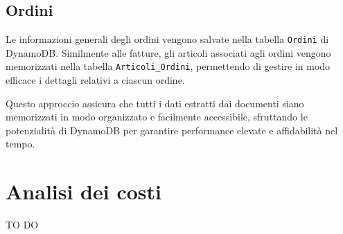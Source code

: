 \subsection{Ordini}
Le informazioni generali degli ordini vengono salvate nella tabella \texttt{Ordini} di DynamoDB. Similmente alle fatture, gli articoli associati agli ordini vengono memorizzati nella tabella \texttt{Articoli\_Ordini}, permettendo di gestire in modo efficace i dettagli relativi a ciascun ordine.

Questo approccio assicura che tutti i dati estratti dai documenti siano memorizzati in modo organizzato e facilmente accessibile, sfruttando le potenzialità di DynamoDB per garantire performance elevate e affidabilità nel tempo.

\section{Analisi dei costi}
TO DO
%
%
%
%
%
%
%
%
%
%
